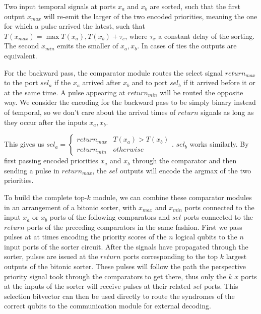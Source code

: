 \documentclass{article}
\begin{document}
Two input temporal signals at ports $x_a$ and $x_b$ are
sorted, such that the first output $x_{max}$ will re-emit
the larger of the two encoded priorities, meaning the one
for which a pulse arrived the latest, such that $T(x_{max})
= \max{T(x_a), T(x_b)} + \tau_c$, where $\tau_x$ a constant
delay of the sorting. The second $x_{min}$ emits the smaller
of $x_a, x_b$. In cases of ties the outputs are equivalent.

For the backward pass, the comparator module routes the
select signal $return_{max}$ to the port $sel_{a}$ if the
$x_a$ arrived after $x_b$ and to port $sel_{b}$ if it
arrived before it or at the same time. A pulse appearing at
$return_{min}$ will be routed the opposite way. We consider
the encoding for the backward pass to be simply binary
instead of temporal, so we don't care about the arrival
times of $return$ signals as long as they occur after the
inputs $x_a, x_b$. 

This gives us $sel_a = \begin{cases} return_{max} &
T(x_a)>T(x_b) \\ return_{min} & otherwise \end{cases}$.
$sel_b$ works similarly. By first passing encoded priorities
$x_a$ and $x_b$ through the comparator and then sending a
pulse in $return_{max}$, the $sel$ outputs will encode the
argmax of the two priorities. 

To build the complete top-$k$ module, we can combine these
comparator modules in an arrangement of a bitonic sorter,
with $x_{max}$ and $x_{min}$ ports connected to the input
$x_a$ or $x_b$ ports of the following comparators and $sel$
ports connected to the $return$ ports of the preceding
comparators in the same fashion. First we pass pulses at at
times encoding the priority scores of the $n$ logical qubits
to the $n$ input ports of the sorter circuit. After the
signals have propagated through the sorter, pulses are
issued at the $return$ ports corresponding to the top $k$
largest outputs of the bitonic sorter. These pulses will
follow the path the perspective priority signal took through
the comparators to get there, thus only the $k$ $x$ ports at
the inputs of the sorter will receive pulses at their
related $sel$ ports. This selection bitvector can then be
used directly to route the syndromes of the correct qubits
to the communication module for external decoding.
\end{document}
